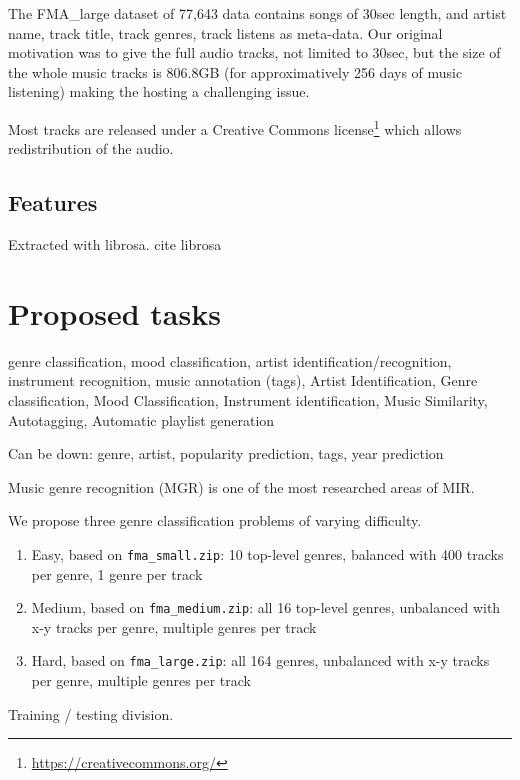\documentclass{article}
\begin{document}
\noindent
The FMA\_large dataset of 77,643 data contains songs of 30sec length, and artist name, track title, track genres, track listens as meta-data. Our original motivation was to give the full audio tracks, not limited to 30sec, but the size of the whole music tracks is 806.8GB (for approximatively 256 days of music listening) making the hosting a challenging issue.



Most tracks are released under a Creative Commons license\footnote{\url{https://creativecommons.org/}} which allows redistribution of the audio.



\subsection{Features}

Extracted with librosa. cite librosa


\section{Proposed tasks} %

genre classification, mood classification, artist identification/recognition, instrument recognition, music annotation (tags),
Artist Identification, Genre classification, Mood Classification, Instrument identification, Music Similarity, Autotagging, Automatic playlist generation

Can be down: genre, artist, popularity prediction, tags, year prediction

Music genre recognition (MGR) is one of the most researched areas of MIR.

We propose three genre classification problems of varying difficulty.

\begin{enumerate}
	\item Easy, based on \texttt{fma\_small.zip}: 10 top-level genres, balanced with 400 tracks per genre, 1 genre per track
	\item Medium, based on \texttt{fma\_medium.zip}: all 16 top-level genres, unbalanced with x-y tracks per genre, multiple genres per track
	\item Hard, based on \texttt{fma\_large.zip}: all 164 genres, unbalanced with x-y tracks per genre, multiple genres per track
\end{enumerate}

Training / testing division.
\end{document}
